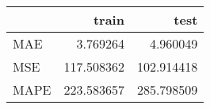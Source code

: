 \begin{tabular}{lrr}
\toprule
{} &       train &        test \\
\midrule
MAE  &    3.769264 &    4.960049 \\
MSE  &  117.508362 &  102.914418 \\
MAPE &  223.583657 &  285.798509 \\
\bottomrule
\end{tabular}
